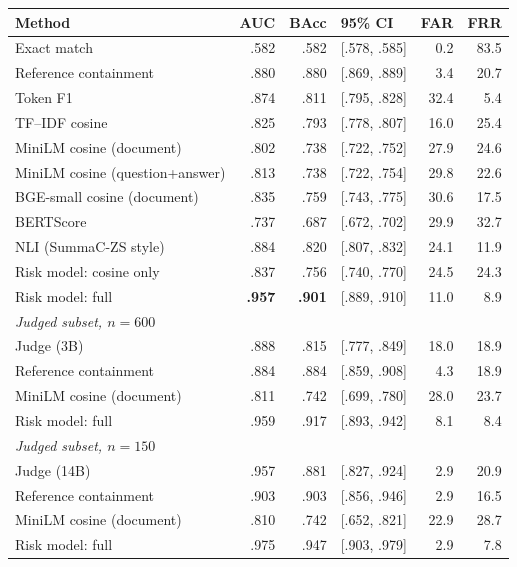 \begin{tabular}{lrrlrr}
\toprule
Method & AUC & BAcc & 95\% CI & FAR & FRR \\
\midrule
Exact match & .582 & .582 & [.578, .585] & 0.2 & 83.5 \\
Reference containment & .880 & .880 & [.869, .889] & 3.4 & 20.7 \\
Token F1 & .874 & .811 & [.795, .828] & 32.4 & 5.4 \\
TF--IDF cosine & .825 & .793 & [.778, .807] & 16.0 & 25.4 \\
\midrule
MiniLM cosine (document) & .802 & .738 & [.722, .752] & 27.9 & 24.6 \\
MiniLM cosine (question+answer) & .813 & .738 & [.722, .754] & 29.8 & 22.6 \\
BGE-small cosine (document) & .835 & .759 & [.743, .775] & 30.6 & 17.5 \\
BERTScore & .737 & .687 & [.672, .702] & 29.9 & 32.7 \\
NLI (SummaC-ZS style) & .884 & .820 & [.807, .832] & 24.1 & 11.9 \\
\midrule
Risk model: cosine only & .837 & .756 & [.740, .770] & 24.5 & 24.3 \\
Risk model: full & \textbf{.957} & \textbf{.901} & [.889, .910] & 11.0 & 8.9 \\
\midrule
\multicolumn{6}{l}{\emph{Judged subset, $n=600$}} \\
Judge (3B) & .888 & .815 & [.777, .849] & 18.0 & 18.9 \\
Reference containment & .884 & .884 & [.859, .908] & 4.3 & 18.9 \\
MiniLM cosine (document) & .811 & .742 & [.699, .780] & 28.0 & 23.7 \\
Risk model: full & .959 & .917 & [.893, .942] & 8.1 & 8.4 \\
\midrule
\multicolumn{6}{l}{\emph{Judged subset, $n=150$}} \\
Judge (14B) & .957 & .881 & [.827, .924] & 2.9 & 20.9 \\
Reference containment & .903 & .903 & [.856, .946] & 2.9 & 16.5 \\
MiniLM cosine (document) & .810 & .742 & [.652, .821] & 22.9 & 28.7 \\
Risk model: full & .975 & .947 & [.903, .979] & 2.9 & 7.8 \\
\bottomrule
\end{tabular}
